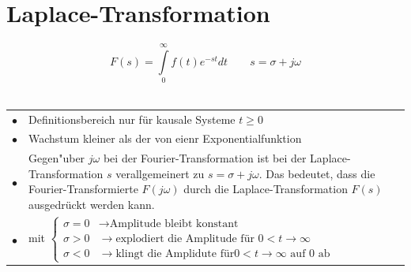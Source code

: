 \newpage
\section{Laplace-Transformation}
	$$\boxed{F(s)=\int\limits_0^\infty f(t)e^{-st}dt} \qquad s=\sigma+j\omega$$\\
	\begin{tabular}{p{1cm}p{17cm}}
		$\bullet$ & Definitionsbereich nur für kausale Systeme $t\geq 0$\\
		$\bullet$ & Wachstum kleiner als der von eienr Exponentialfunktion\\ 
		$\bullet$ & Gegen"uber $j\omega$ bei der Fourier-Transformation ist bei der
			Laplace-Transformation $s$ verallgemeinert zu $s=\sigma + j\omega$. Das
			bedeutet, dass die Fourier-Transformierte $F(j\omega)$ durch die
			Laplace-Transformation $F(s)$ ausgedr\"uckt werden kann. \\
		$\bullet$ & mit 
		$\begin{cases} 
		\sigma = 0 & \rightarrow \text{Amplitude bleibt konstant} \\ 
		\sigma > 0 & \rightarrow \text{explodiert die Amplitude f\"ur } 0 < t \rightarrow \infty \\
		\sigma < 0 & \rightarrow \text{klingt die Amplidute für} 0 < t \rightarrow \infty \text{ auf $0$ ab} \
		 \end{cases} $ \\   
	\end{tabular}
	
